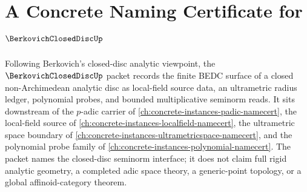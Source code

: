 \chapter{A Concrete Naming Certificate for $\BerkovichClosedDiscUp$}
\label{ch:concrete-instances-berkovich-closed-disc-namecert}

Following Berkovich's closed-disc analytic viewpoint, the $\BerkovichClosedDiscUp$ packet records the finite BEDC surface of a closed non-Archimedean analytic disc as local-field source data, an ultrametric radius ledger, polynomial probes, and bounded multiplicative seminorm reads. It sits downstream of the $p$-adic carrier of \autoref{ch:concrete-instances-padic-namecert}, the local-field source of \autoref{ch:concrete-instances-localfield-namecert}, the ultrametric space boundary of \autoref{ch:concrete-instances-ultrametricspace-namecert}, and the polynomial probe family of \autoref{ch:concrete-instances-polynomial-namecert}. The packet names the closed-disc seminorm interface; it does not claim full rigid analytic geometry, a completed adic space theory, a generic-point topology, or a global affinoid-category theorem.

